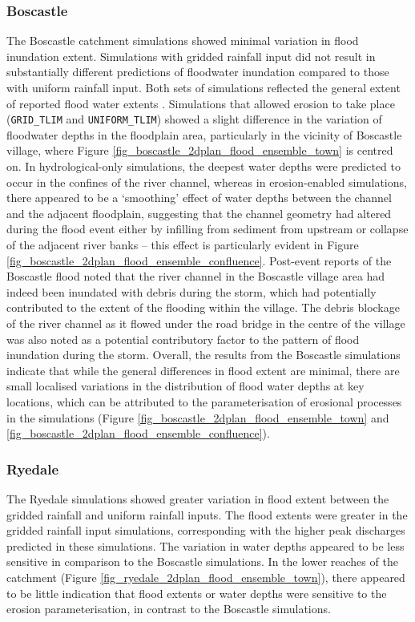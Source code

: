 \subsubsection{Boscastle}
The Boscastle catchment simulations showed minimal variation in flood inundation extent. Simulations with gridded rainfall input did not result in substantially different predictions of floodwater inundation compared to those with uniform rainfall input. Both sets of simulations reflected the general extent of reported flood water extents \citep{wallingford2005flooding}. Simulations that allowed erosion to take place (\texttt{GRID\_TLIM} and \texttt{UNIFORM\_TLIM}) showed a slight difference in the variation of floodwater depths in the floodplain area, particularly in the vicinity of Boscastle village, where Figure \ref{fig_boscastle_2dplan_flood_ensemble_town} is centred on. In hydrological-only simulations, the deepest water depths were predicted to occur in the confines of the river channel, whereas in erosion-enabled simulations, there appeared to be a `smoothing' effect of water depths between the channel and the adjacent floodplain, suggesting that the channel geometry had altered during the flood event either by infilling from sediment from upstream or collapse of the adjacent river banks -- this effect is particularly evident in Figure \ref{fig_boscastle_2dplan_flood_ensemble_confluence}. Post-event reports of the Boscastle flood noted that the river channel in the Boscastle village area had indeed been inundated with debris during the storm, which had potentially contributed to the extent of the flooding within the village. The debris blockage of the  river channel as it flowed under the road bridge in the centre of the village was also noted as a potential contributory factor to the pattern of flood inundation during the storm. Overall, the results from the Boscastle simulations indicate that while the general differences in flood extent are minimal, there are small localised variations in the distribution of flood water depths at key locations, which can be attributed to the parameterisation of erosional processes in the simulations (Figure \ref{fig_boscastle_2dplan_flood_ensemble_town} and \ref{fig_boscastle_2dplan_flood_ensemble_confluence}).

\subsubsection{Ryedale}
The Ryedale simulations showed greater variation in flood extent between the gridded rainfall and uniform rainfall inputs. The flood extents were greater in the gridded rainfall input simulations, corresponding with the higher peak discharges predicted in these simulations.  The variation in water depths appeared to be less sensitive in comparison to the Boscastle simulations. In the lower reaches of the catchment (Figure \ref{fig_ryedale_2dplan_flood_ensemble_town}), there appeared to be little indication that flood extents or water depths were sensitive to the erosion parameterisation, in contrast to the Boscastle simulations.


